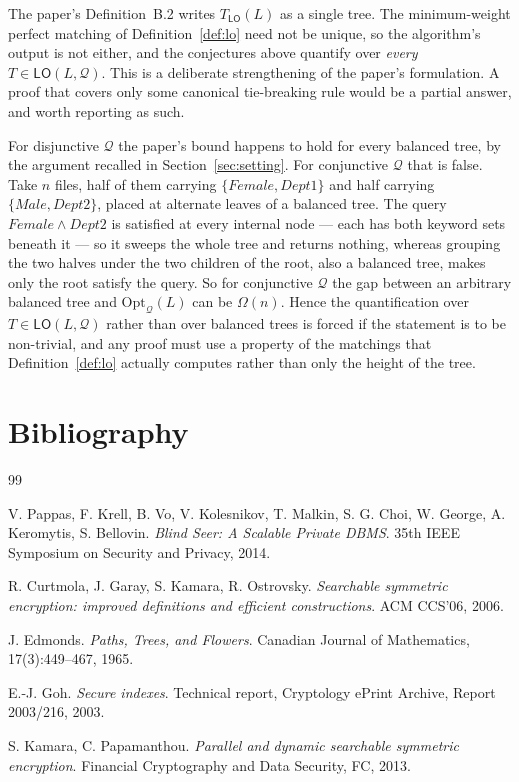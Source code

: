 \documentclass{conjura-conjecture}
\newcommand{\Qd}{\mathcal{Q}}
\newcommand{\Opt}{\mathrm{Opt}}
\newcommand{\LO}{\mathsf{LO}}
\begin{document}
\begin{remark}\label{rem:ties}
The paper's Definition~B.2 writes $T_{\LO}(L)$ as a single tree. The
minimum-weight perfect matching of Definition~\ref{def:lo} need not be
unique, so the algorithm's output is not either, and the conjectures above
quantify over \emph{every} $T \in \LO(L,\Qd)$. This is a deliberate
strengthening of the paper's formulation. A proof that covers only some
canonical tie-breaking rule would be a partial answer, and worth reporting
as such.
\end{remark}

\begin{remark}\label{rem:shape}
For disjunctive $\Qd$ the paper's bound happens to hold for every balanced
tree, by the argument recalled in Section~\ref{sec:setting}. For
conjunctive $\Qd$ that is false. Take $n$ files, half of them carrying
$\{\mathit{Female},\mathit{Dept1}\}$ and half carrying
$\{\mathit{Male},\mathit{Dept2}\}$, placed at alternate leaves of a
balanced tree. The query $\mathit{Female} \wedge \mathit{Dept2}$ is
satisfied at every internal node --- each has both keyword sets beneath it
--- so it sweeps the whole tree and returns nothing, whereas grouping the
two halves under the two children of the root, also a balanced tree, makes
only the root satisfy the query. So for conjunctive $\Qd$ the gap between
an arbitrary balanced tree and $\Opt_{\Qd}(L)$ can be $\Omega(n)$. Hence
the quantification over $T \in \LO(L,\Qd)$ rather than over balanced trees
is forced if the statement is to be non-trivial, and any proof must use a
property of the matchings that Definition~\ref{def:lo} actually computes
rather than only the height of the tree.
\end{remark}

\section{Bibliography}

\begin{conjurabibliography}{99}

V. Pappas, F. Krell, B. Vo, V. Kolesnikov, T. Malkin, S. G. Choi,
W. George, A. Keromytis, S. Bellovin.
\emph{Blind Seer: A Scalable Private DBMS}.
35th IEEE Symposium on Security and Privacy, 2014.

R. Curtmola, J. Garay, S. Kamara, R. Ostrovsky.
\emph{Searchable symmetric encryption: improved definitions and efficient
constructions}.
ACM CCS'06, 2006.

J. Edmonds.
\emph{Paths, Trees, and Flowers}.
Canadian Journal of Mathematics, 17(3):449--467, 1965.

E.-J. Goh.
\emph{Secure indexes}.
Technical report, Cryptology ePrint Archive, Report 2003/216, 2003.

S. Kamara, C. Papamanthou.
\emph{Parallel and dynamic searchable symmetric encryption}.
Financial Cryptography and Data Security, FC, 2013.

\end{conjurabibliography}
\end{document}
